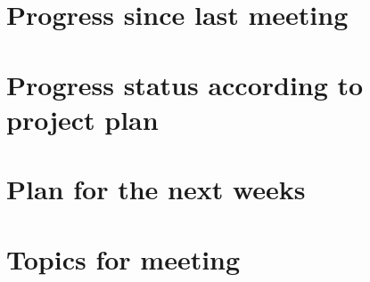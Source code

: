 \documentclass[main.tex]{subfiles}
\begin{document}
\section*{Progress since last meeting}
\section*{Progress status according to project plan}
\section*{Plan for the next weeks}
\section*{Topics for meeting}
\end{document}
